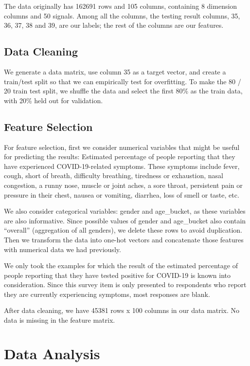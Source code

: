 \documentclass[10pt, a4paper, twocolumn]{article} %
\begin{document}
The data originally has 162691 rows and 105 columns, containing 8 dimension columns and 50 signals. Among all the columns, the testing result columns, 35, 36, 37, 38 and 39, are our labels; the rest of the columns are our features. 


\subsection{Data Cleaning}

We generate a data matrix, use column 35 as a target vector, and create a train/test split so that we can empirically test for overfitting. To make the 80 / 20 train test split, we shuffle the data and select the first 80\% as the train data, with 20\% held out for validation.

\subsection{Feature Selection}

For feature selection, first we consider numerical variables that might be useful for predicting the results: Estimated percentage of people reporting that they have experienced COVID-19-related symptoms. These symptoms  include fever, cough, short of breath, difficulty breathing, tiredness or exhaustion, nasal congestion, a runny nose, muscle or joint aches, a sore throat, persistent pain or pressure in their chest, nausea or vomiting, diarrhea, loss of smell or taste, etc. 


We also consider categorical variables: gender and age\_bucket, as these variables are also informative. Since possible values of gender and age\_bucket also contain “overall” (aggregation of all genders), we delete these rows to avoid duplication. Then we transform the data into one-hot vectors and concatenate those features with numerical data we had previously.


We only took the examples for which the result of the estimated percentage of people reporting that they have tested positive for COVID-19 is known into consideration. Since this survey item is only presented to respondents who report they are currently experiencing symptoms, most responses are blank. 

After data cleaning, we have 45381 rows x 100 columns in our data matrix. No data is missing in the feature matrix.




\section{Data Analysis}
\end{document}
